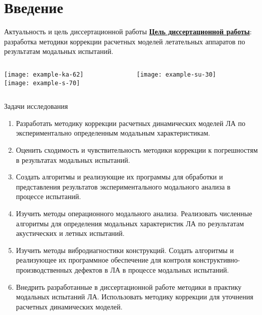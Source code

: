 
\begin{frame}
    \setcounter{framenumber}{1}
    \maketitle
\end{frame}

\section{Введение}

\begin{frame}{Актуальность и цель диссертационной работы}
	\textbf{\underline{Цель диссертационной работы}}: разработка методики коррекции расчетных моделей летательных аппаратов по результатам модальных испытаний.
	\vfill
	\begin{columns}
		\hfill
		\begin{column}{0.40\textwidth}
			\centering
			\texttt{[image: example-ka-62]} \\ \vspace{0.5em}
			\texttt{[image: example-s-70]}
		\end{column}
		\begin{column}{0.57\textwidth}
			\centering
			\texttt{[image: example-su-30]}	
		\end{column}
		\hfill
	\end{columns}	
\end{frame}

\begin{frame}{Задачи исследования}
	\begin{enumerate}
		\item Разработать методику коррекции расчетных динамических моделей ЛА по экспериментально определенным модальным характеристикам.
		\item Оценить сходимость и чувствительность методики коррекции к погрешностям в результатах модальных испытаний.
		\item Создать алгоритмы и реализующие их программы для обработки и представления результатов экспериментального модального анализа в процессе испытаний.
		\item Изучить методы операционного модального анализа. Реализовать численные алгоритмы для определения модальных характеристик ЛА по результатам акустических и летных испытаний.
		\item Изучить методы вибродиагностики конструкций. Создать алгоритмы и реализующее их программное обеспечение для контроля конструктивно-производственных дефектов в ЛА в процессе модальных испытаний.
		\item Внедрить разработанные в диссертационной работе методики в практику  модальных испытаний ЛА. Использовать методику коррекции для уточнения расчетных динамических моделей.
	\end{enumerate}
\end{frame}

